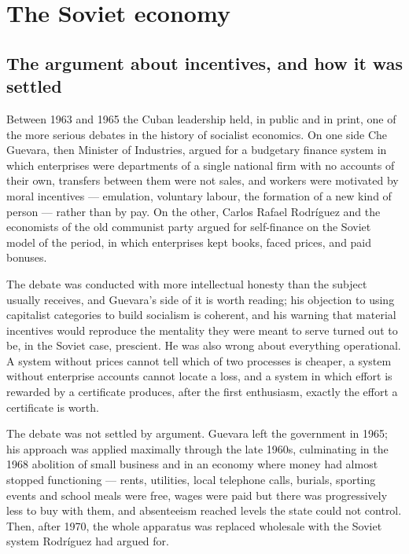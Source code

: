 \chapter{The Soviet economy}
\label{ch:sovieteconomy}

\section{The argument about incentives, and how it was settled}

Between 1963 and 1965 the Cuban leadership held, in public and in print, one of
the more serious debates in the history of socialist economics. On one side Che
Guevara, then Minister of Industries, argued for a budgetary finance system in
which enterprises were departments of a single national firm with no accounts of
their own, transfers between them were not sales, and workers were motivated by
moral incentives --- emulation, voluntary labour, the formation of a new kind of
person --- rather than by pay. On the other, Carlos Rafael Rodr\'iguez and the
economists of the old communist party argued for self-finance on the Soviet
model of the period, in which enterprises kept books, faced prices, and paid
bonuses.

The debate was conducted with more intellectual honesty than the subject
usually receives, and Guevara's side of it is worth reading; his objection to
using capitalist categories to build socialism is coherent, and his warning
that material incentives would reproduce the mentality they were meant to serve
turned out to be, in the Soviet case, prescient. He was also wrong about
everything operational. A system without prices cannot tell which of two
processes is cheaper, a system without enterprise accounts cannot locate a
loss, and a system in which effort is rewarded by a certificate produces, after
the first enthusiasm, exactly the effort a certificate is worth.

The debate was not settled by argument. Guevara left the government in 1965;
his approach was applied maximally through the late 1960s, culminating in the
1968 abolition of small business and in an economy where money had almost
stopped functioning --- rents, utilities, local telephone calls, burials,
sporting events and school meals were free, wages were paid but there was
progressively less to buy with them, and absenteeism reached levels the state
could not control. Then, after 1970, the whole apparatus was replaced wholesale
with the Soviet system Rodr\'iguez had argued for.

